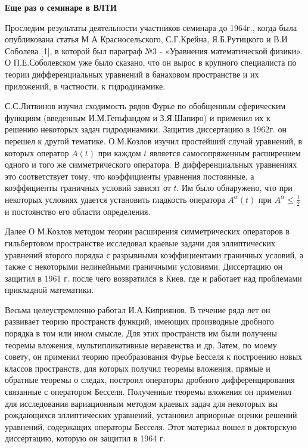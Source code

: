 {\bf Еще раз о семинаре в ВЛТИ}

Проследим результаты деятельности участников семинара до 1964г., когда была опубликована статья М А Красносельского, С.Г.Крейна, Я.Б.Рутицкого и В.И Соболева [1], в которой был параграф №3 - «Уравнения математической физики». О П.Е.Соболевском уже было сказано, что он вырос в крупного
специалиста по теории дифференциальных уравнений в банаховом пространстве и их приложений, в частности, к гидродинамике.

С.С.Литвинов изучил сходимость рядов Фурье по обобщенным сферическим функциям (введенным И.М.Гепьфандом и З.Я.Шапиро) и применил их к решению некоторых задач гидродинамики. Защитив диссертацию в 1962г. он перешел к другой тематике. О.М.Козлов изучил простейший случай уравнений, в которых оператор $A(t)$ при каждом $t$ является самосопряженным расширением одного и того же симметрического оператора. В дифференциальных уравнениях это соответствует тому, что коэффициенты уравнения постоянные, а коэффициенты граничных условий зависят от $t$. Им было обнаружено, что при некоторых условиях удается установить гладкость оператора $A^{\alpha}(t)$ при $A^{\alpha} \le \frac{1}{2}$  и постоянство его области определения.

Далее О М.Козлов методом теории расширения симметрических операторов в гильбертовом пространстве исследовал краевые задачи для эллиптических уравнений второго порядка с разрывными коэффициентами граничных условий, а также с некоторыми нелинейными граничными условиями. Диссертацию он защитил в 1961 г. после чего возвратился в Киев, где и работает над проблемами прикладной математики.

Весьма целеустремленно работал И.А.Киприянов. В течение ряда лет он развивает теорию пространств функций, имеющих производные дробного порядка в том или ином смысле. Для этих пространств им были получены теоремы вложения, мультипликативные неравенства и др. Затем, по моему совету, он применил теорию преобразования Фурье Бесселя к построению новых классов пространств, для которых получил теоремы вложения, прямые и обратные теоремы о следах, построил операторы дробного дифференцирования связанные с оператором Бесселя. Полученные теоремы вложения он применил для исследования вариационным методом краевых задач для некоторых вы рождающихся эллиптических уравнений, установил априорные оценки решений уравнений, содержащих операторы Бесселя. Этот материал вошел в докторскую диссертацию, которую он защитил в 1964 г.

